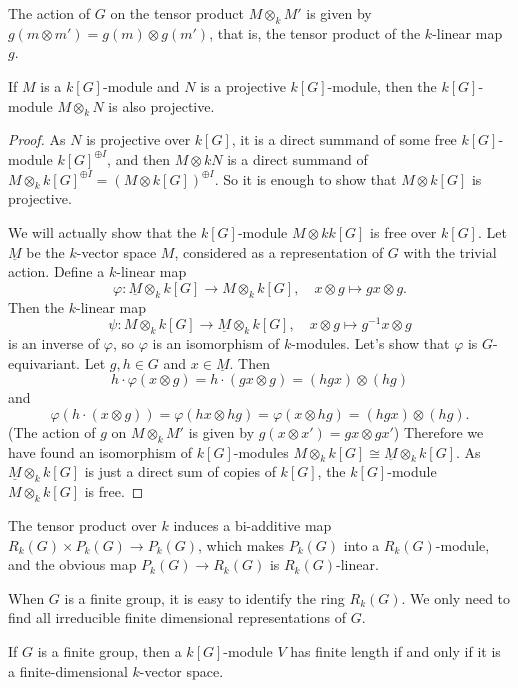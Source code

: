 \begin{remark}
The action of $G$ on the tensor product $M\otimes_kM'$ is given by $g(m\otimes m')=g(m)\otimes g(m')$, that is, the tensor product of the $k$-linear map $g$.
\end{remark}
\begin{proposition}
If $M$ is a $k[G]$-module and $N$ is a projective $k[G]$-module, then the $k[G]$-module $M\otimes_kN$ is also projective.
\end{proposition}
\begin{proof}
As $N$ is projective over $k[G]$, it is a direct summand of some free $k[G]$-module $k[G]^{\oplus I}$, and then $M\otimes kN$ is a direct summand of $M\otimes_kk[G]^{\oplus I}=(M\otimes k[G])^{\oplus I}$. So it is enough to
show that $M\otimes k[G]$ is projective.\par
We will actually show that the $k[G]$-module $M\otimes kk[G]$ is free over $k[G]$. Let $\underline{M}$ be the $k$-vector space $M$, considered as a representation of $G$ with the trivial action. Define a $k$-linear map
\[\varphi:\underline{M}\otimes_kk[G]\to M\otimes_kk[G],\quad x\otimes g\mapsto gx\otimes g.\]
Then the $k$-linear map 
\[\psi:M\otimes_kk[G]\to \underline{M}\otimes_kk[G],\quad x\otimes g\mapsto g^{-1}x\otimes g\] is an inverse of $\varphi$, so $\varphi$ is an isomorphism of $k$-modules. Let's show that $\varphi$ is $G$-equivariant. Let $g,h\in G$ and $x\in\underline{M}$. Then
\[h\cdot\varphi(x\otimes g)=h\cdot(gx\otimes g)=(hgx)\otimes(hg)\]
and
\[\varphi(h\cdot(x\otimes g))=\varphi(hx\otimes hg)=\varphi(x\otimes hg)=(hgx)\otimes(hg).\]
(The action of $g$ on $M\otimes_kM'$ is given by $g(x\otimes x')=gx\otimes gx'$) Therefore we have found an isomorphism of $k[G]$-modules $M\otimes_kk[G]\cong\underline{M}\otimes_kk[G]$. As $\underline{M}\otimes_kk[G]$ is just a direct sum of copies of $k[G]$, the $k[G]$-module $M\otimes_kk[G]$ is free.
\end{proof}
\begin{corollary}
The tensor product over $k$ induces a bi-additive map $R_k(G)\times P_k(G)\to P_k(G)$, which makes $P_k(G)$ into a $R_k(G)$-module, and the obvious map $P_k(G)\to R_k(G)$ is $R_k(G)$-linear.
\end{corollary}
When $G$ is a finite group, it is easy to identify the ring $R_k(G)$. We only need to find all irreducible finite dimensional representations of $G$.
\begin{proposition}
If $G$ is a finite group, then a $k[G]$-module $V$ has finite length if and only if it is a finite-dimensional $k$-vector space.
\end{proposition}
